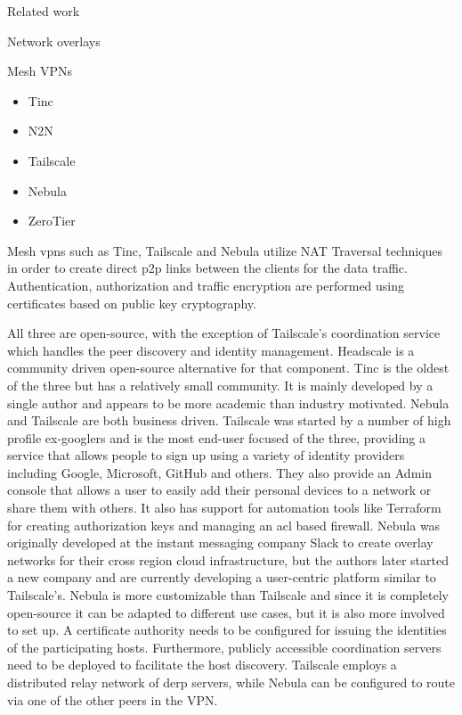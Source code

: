 \begin{frame}[fragile]{Related work}
\begin{block}{Network overlays}
\begin{block}{Mesh VPNs}
\protect\hypertarget{mesh-vpns}{}
\begin{itemize}
\tightlist
\item
  Tinc
\item
  N2N
\item
  Tailscale
\item
  Nebula
\item
  ZeroTier
\end{itemize}

Mesh \glspl{vpn} such as Tinc\autocite{tincDocs},
Tailscale\autocite{tailscaleDocs} and Nebula\autocite{nebulaDocs}
utilize NAT Traversal techniques in order to create direct \gls{p2p}
links between the clients for the data traffic. Authentication,
authorization and traffic encryption are performed using certificates
based on public key cryptography.

All three are open-source, with the exception of Tailscale's
coordination service which handles the peer discovery and identity
management. Headscale \autocite{fontJuanfontHeadscale2022} is a
community driven open-source alternative for that component. Tinc is the
oldest of the three but has a relatively small community. It is mainly
developed by a single author and appears to be more academic than
industry motivated. Nebula and Tailscale are both business driven.
Tailscale was started by a number of high profile ex-googlers and is the
most end-user focused of the three, providing a service that allows
people to sign up using a variety of identity providers including
Google, Microsoft, GitHub and others. They also provide an Admin console
that allows a user to easily add their personal devices to a network or
share them with others. It also has support for automation tools like
Terraform for creating authorization keys and managing an \gls{acl}
based firewall. Nebula was originally developed at the instant messaging
company Slack to create overlay networks for their cross region cloud
infrastructure, but the authors later started a new company and are
currently developing a user-centric platform similar to Tailscale's.
Nebula is more customizable than Tailscale and since it is completely
open-source it can be adapted to different use cases, but it is also
more involved to set up. A certificate authority needs to be configured
for issuing the identities of the participating hosts. Furthermore,
publicly accessible coordination servers need to be deployed to
facilitate the host discovery. Tailscale employs a distributed relay
network of \gls{derp} servers, while Nebula can be configured to route
via one of the other peers in the VPN.
\end{block}


\end{block}
\end{frame}
